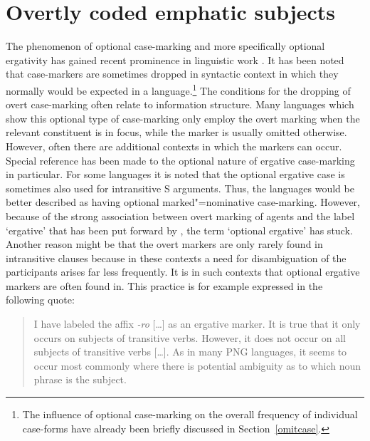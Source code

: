 

\section{Overtly coded emphatic subjects}\label{focusNOM}

The phenomenon of optional case-marking and more specifically optional ergativity has gained recent prominence in linguistic work \citep[see][]{OptionalErg}. 
It has been noted that case-markers are sometimes dropped in syntactic context in which they normally would be expected in a language.\footnote{The influence of optional case-marking on the overall frequency of individual case-forms have already been briefly discussed in Section~\ref{omitcase}.} 
The conditions for the dropping of overt case-marking often relate to information structure. 
Many languages which show this optional type of case-marking only employ the overt marking when the relevant constituent is in focus, while the marker is usually omitted otherwise. 
However, often there are additional contexts in which the markers can occur.
Special reference has been made to the optional nature of ergative case-marking in particular. 
For some languages it is noted that the optional ergative case is sometimes also used for intransitive S arguments. 
Thus, the languages would be better described as having optional marked"=nominative case-marking. 
However, because of the strong association between overt marking of agents and the label `ergative' that has been put forward by \citet{Dixon:1979}, the term `optional ergative' has stuck. 
Another reason might be that the overt markers are only rarely found in intransitive clauses because in these contexts a need for disambiguation of the participants arises far less frequently.
It is in such contexts that optional ergative markers are often found in. 
This practice is for example expressed in the following quote:  

\begin{quote}
I have labeled the affix \emph{-ro} [\dots] as an ergative marker. It is true that it only occurs on subjects of transitive verbs. However, it does not occur on all subjects of transitive verbs [\dots]. As in many PNG languages, it seems to occur most commonly where there is potential ambiguity as to which noun phrase is the subject. \citep[22]{Clifton:1997}
\end{quote}

